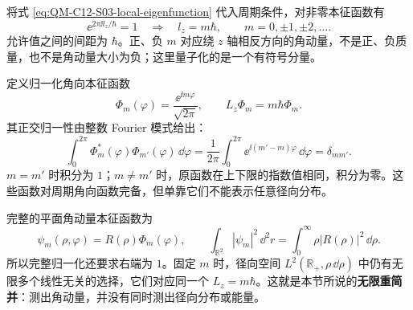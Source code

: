 将式 \eqref{eq:QM-C12-S03-local-eigenfunction} 代入周期条件，对非零本征函数有
\begin{equation}
  \ee^{2\pi\ii l_z/\hbar}=1
  \quad\Longrightarrow\quad
  \boxed{l_z=m\hbar,\qquad m=0,\pm1,\pm2,\ldots}.
  \label{eq:QM-C12-S03-spectrum}
\end{equation}
允许值之间的间距为 $\hbar$。正、负 $m$ 对应绕 $z$ 轴相反方向的角动量，不是正、负质量，也不是角动量大小为负；这里量子化的是一个有符号分量。



定义归一化角向本征函数
\begin{equation}
  \boxed{\Phi_m(\varphi)=\frac{\ee^{\ii m\varphi}}{\sqrt{2\pi}}},
  \qquad L_z\Phi_m=m\hbar\Phi_m.
\end{equation}
其正交归一性由整数 Fourier 模式给出：
\begin{equation}
  \int_0^{2\pi}\Phi_m^*(\varphi)\Phi_{m'}(\varphi)\,\dd\varphi
  =\frac{1}{2\pi}\int_0^{2\pi}\ee^{\ii(m'-m)\varphi}\,\dd\varphi
  =\delta_{mm'}.
  \label{eq:QM-C12-S03-angular-orthogonality}
\end{equation}
$m=m'$ 时积分为 $1$；$m\neq m'$ 时，原函数在上下限的指数值相同，积分为零。这些函数对周期角向函数完备，但单靠它们不能表示任意径向分布。

完整的平面角动量本征函数为
\begin{equation}
  \psi_m(\rho,\varphi)=R(\rho)\Phi_m(\varphi),\qquad
  \int_{\mathbb R^2}|\psi_m|^2\,\dd^2r
  =\int_0^\infty\rho|R(\rho)|^2\,\dd\rho.
\end{equation}
所以完整归一化还要求右端为 $1$。固定 $m$ 时，径向空间 $L^2(\mathbb R_+,\rho\,\dd\rho)$ 中仍有无限多个线性无关的选择，它们对应同一个 $L_z=m\hbar$。这就是本节所说的\textbf{无限重简并}：测出角动量，并没有同时测出径向分布或能量。

